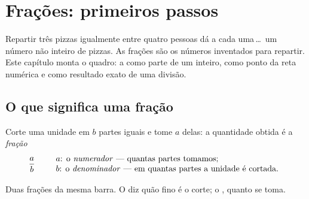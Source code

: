 \chapter{Frações: primeiros passos}\label{ch:g6:fractions}

Repartir três pizzas igualmente entre quatro pessoas dá a cada
uma\,\dots\ um número não inteiro de pizzas. As frações são os números
inventados para repartir. Este capítulo monta o quadro: a  como
parte de um inteiro, como ponto da reta numérica e como resultado exato
de uma divisão.

\section{O que significa uma fração}

\begin{definition}[Fração]\label{def:g6:fractions:def}
Corte uma unidade em $b$ partes iguais e tome $a$ delas: a quantidade
obtida é a \emph{fração}
\[
\frac{a}{b}
\qquad
\begin{array}{l}
a \text{: o \emph{numerador} --- quantas partes tomamos;}\\
b \text{: o \emph{denominador} --- em quantas partes a unidade é cortada.}
\end{array}
\]
\end{definition}

\begin{omfigure}

{\small Duas frações da mesma barra. O  diz quão fino é o
corte; o , quanto se toma.}
\end{omfigure}

